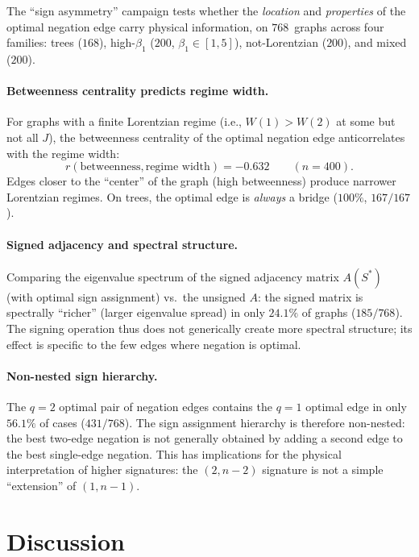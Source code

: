 \documentclass[11pt]{article}
\theoremstyle{definition}
\theoremstyle{remark}
\begin{document}
The ``sign asymmetry'' campaign tests whether the \emph{location} and
\emph{properties} of the optimal negation edge carry physical information,
on $768$~graphs across four families: trees ($168$), high-$\beta_1$ ($200$,
$\beta_1 \in [1,5]$), not-Lorentzian ($200$), and mixed ($200$).

\paragraph{Betweenness centrality predicts regime width.}
For graphs with a finite Lorentzian regime (i.e., $W(1) > W(2)$ at some
but not all $J$), the betweenness centrality of the optimal negation edge
anticorrelates with the regime width:
\begin{equation}
  r(\text{betweenness}, \text{regime width}) = -0.632 \qquad (n = 400).
  \label{eq:betweenness-corr}
\end{equation}
Edges closer to the ``center'' of the graph (high betweenness) produce
narrower Lorentzian regimes. On trees, the optimal edge is \emph{always}
a bridge ($100\%$, $167/167$).

\paragraph{Signed adjacency and spectral structure.}
Comparing the eigenvalue spectrum of the signed adjacency matrix $A(S^*)$
(with optimal sign assignment) vs.\ the unsigned $A$:
the signed matrix is spectrally ``richer'' (larger eigenvalue spread)
in only $24.1\%$ of graphs ($185/768$). The signing operation thus does not
generically create more spectral structure; its effect is specific to the
few edges where negation is optimal.

\paragraph{Non-nested sign hierarchy.}
The $q = 2$ optimal pair of negation edges contains the $q = 1$ optimal
edge in only $56.1\%$ of cases ($431/768$). The sign assignment hierarchy
is therefore non-nested: the best two-edge negation is not generally obtained
by adding a second edge to the best single-edge negation. This has
implications for the physical interpretation of higher signatures: the
$(2, n{-}2)$ signature is not a simple ``extension'' of $(1, n{-}1)$.

\section{Discussion}
\label{sec:discussion}
\end{document}
